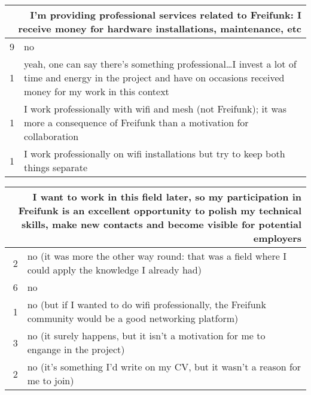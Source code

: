 \begin{table}[h]
  \begin{tabular}{| r | p{\textwidth} |}
    \hline
    \multicolumn{2}{|p{\textwidth}|}{I'm providing professional services related to Freifunk: I receive money for hardware installations, maintenance, etc} \\
    \hline
    9 & no \\
    1 & yeah, one can say there's something professional\ldots I invest a lot of time and energy in the project and have on occasions received money for my work in this context \\
    1 & I work professionally with wifi and mesh (not Freifunk); it was more a consequence of Freifunk than a motivation for collaboration \\
    1 & I work professionally on wifi installations but try to keep both things separate \\
    \hline
  \end{tabular}
\end{table}

\begin{table}[h]
  \begin{tabular}{| r | p{\textwidth} |}
    \hline
    \multicolumn{2}{|p{\textwidth}|}{I want to work in this field later, so my participation in Freifunk is an excellent opportunity to polish my technical skills, make new contacts and become visible for potential employers} \\
    \hline
    2 & no (it was more the other way round: that was a field where I could apply the knowledge I already had) \\
    6 & no \\
    1 & no (but if I wanted to do wifi professionally, the Freifunk community would be a good networking platform) \\
    3 & no (it surely happens, but it isn't a motivation for me to engange in the project) \\
    2 & no (it's something I'd write on my CV, but it wasn't a reason for me to join) \\
    \hline
  \end{tabular}
\end{table}


